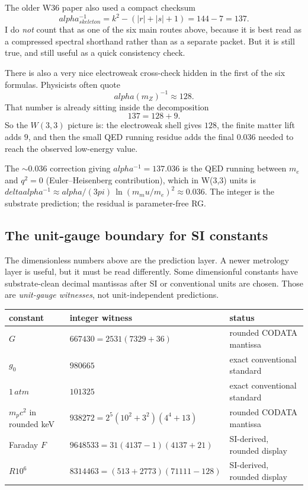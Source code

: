 \documentclass[11pt]{article}
\def\mathrm#1{#1}%
\def\text#1{#1}%
\def\alpha{alpha}%
\def\delta{delta}%
\def\mu{mu}%
\def\pi{pi}%
\def\cdot{ }%
\begin{document}
The older W36 paper also used a compact checksum
\[
\alpha^{-1}_{\text{skeleton}} = k^2 - (|r| + |s| + 1) = 144 - 7 = 137.
\]
I do \emph{not} count that as one of the six main routes above, because it is
best read as a compressed spectral shorthand rather than as a separate packet.
But it is still true, and still useful as a quick consistency check.

There is also a very nice electroweak cross-check hidden in the first of the
six formulas. Physicists often quote
\[
\alpha(m_Z)^{-1} \approx 128.
\]
That number is already sitting inside the decomposition
\[
137 = 128 + 9.
\]
So the $W(3,3)$ picture is: the electroweak shell gives $128$, the finite
matter lift adds $9$, and then the small QED running residue adds the final
$0.036$ needed to reach the observed low-energy value.

The $\sim 0.036$ correction giving $\alpha^{-1} = 137.036$ is the QED running between $m_e$ and $q^2 = 0$ (Euler--Heisenberg contribution), which in W(3,3) units is $\delta\alpha^{-1} \approx \alpha/(3\pi)\,\ln(m_\mu/m_e)^2 \approx 0.036$. The integer is the substrate prediction; the residual is parameter-free RG.

\subsection*{The unit-gauge boundary for SI constants}

The dimensionless numbers above are the prediction layer.  A newer
metrology layer is useful, but it must be read differently.  Some
dimensionful constants have substrate-clean decimal mantissas after SI or
conventional units are chosen.  Those are \emph{unit-gauge witnesses}, not
unit-independent predictions.

\begin{center}
\small
\renewcommand{\arraystretch}{1.15}
\begin{tabular}{l l l}
\toprule
constant & integer witness & status \\
\midrule
$G$ & $667430=2\cdot5\cdot31(73\cdot29+36)$ & rounded CODATA mantissa \\
$g_0$ & $980665$ & exact conventional standard \\
$1\,\mathrm{atm}$ & $101325$ & exact conventional standard \\
$m_pc^2$ in rounded keV & $938272=2^5(10^2+3^2)(4^4+13)$ & rounded CODATA mantissa \\
Faraday $F$ & $9648533=31(4\cdot137-1)(4\cdot137+21)$ & SI-derived, rounded display \\
$R\cdot10^6$ & $8314463=(5\cdot13+2\cdot7\cdot73)(7\cdot1111-128)$ & SI-derived, rounded display \\
\bottomrule
\end{tabular}
\end{center}
\end{document}
